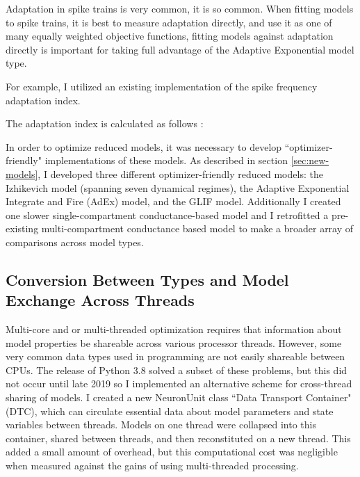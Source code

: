 Adaptation in spike trains is very common, it is so common. When fitting models to spike trains, it is best to measure adaptation directly, and use it as one of many equally weighted objective functions, fitting models against adaptation directly is important for taking full advantage of the Adaptive Exponential model type.

For example, I utilized an existing implementation of the spike frequency adaptation index.


The adaptation index is calculated as follows \citep{EFEL}:

  

In order to optimize reduced models, it was necessary to develop ``optimizer-friendly" implementations of these models.
As described in section \ref{sec:new-models}, I developed three different optimizer-friendly reduced models: the Izhikevich model (spanning seven dynamical regimes), the Adaptive Exponential Integrate and Fire (AdEx) model, and the GLIF model.
Additionally I created one slower single-compartment conductance-based model and I retrofitted a pre-existing multi-compartment conductance based model to make a broader array of comparisons across model types.

\subsection{Conversion Between Types and Model Exchange Across Threads}
Multi-core and or multi-threaded optimization requires that information about model properties be shareable across various processor threads.
However, some very common data types used in programming are not easily shareable between CPUs.
The release of Python 3.8 solved a subset of these problems, but this did not occur until late 2019 so I implemented an alternative scheme for cross-thread sharing of models.
I created a new NeuronUnit class ``Data Transport Container" (DTC), which can circulate essential data about model parameters and state variables between threads.
Models on one thread were collapsed into this container, shared between threads, and then reconstituted on a new thread.
This added a small amount of overhead, but this computational cost was negligible when measured against the gains of using multi-threaded processing.

